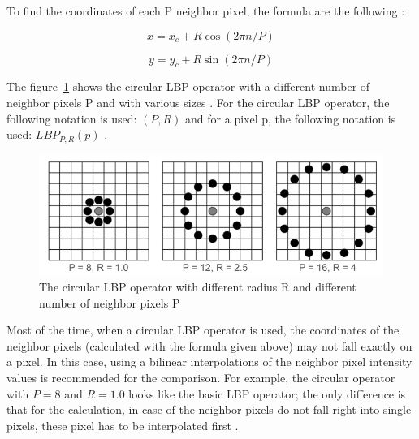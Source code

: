 \noindent To find the coordinates of each P neighbor pixel, the formula are the following \cite{JUL07}:
\newline

\begin{equation}
   x = x_c + R\cos(2\pi n/P)
\end{equation}

\begin{equation}
   y = y_c + R\sin(2\pi n/P)
\end{equation}

\vspace{\baselineskip}
\noindent The figure~\ref{lbp_circular_operator} shows the circular LBP operator with a different number of neighbor pixels P and with various sizes \cite{JUL07}. For the circular LBP operator, the following notation is used: $ (P,R) $ and for a pixel p, the following notation is used: $ LBP_{P,R}(p) $ \cite{GAN08}.
\newline

\begin{figure}[!h]
\begin{center}
\noindent \includegraphics[scale=0.5]{figures/lbp_circular_operator} 
\newline
\caption{The circular LBP operator with different radius R and different number of neighbor pixels P}
\label{lbp_circular_operator}
\end{center} 
\end{figure}

\noindent Most of the time, when a circular LBP operator is used, the coordinates of the neighbor pixels (calculated with the formula given above) may not fall exactly on a pixel. In this case, using a bilinear interpolations of the neighbor pixel intensity values is recommended for the comparison. For example, the circular operator with $ P = 8 $ and $ R = 1.0 $ looks like the basic LBP operator; the only difference is that for the calculation, in case of the neighbor pixels do not fall right into single pixels, these pixel has to be interpolated first \cite{GAN08}.
\newline

